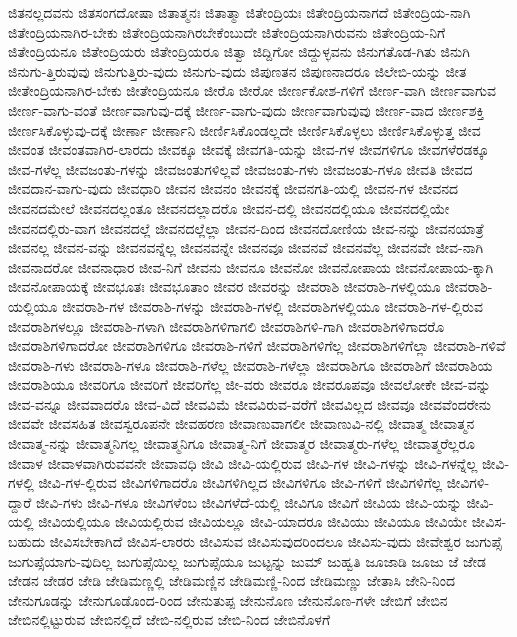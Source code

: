 {ಜಿತನಲ್ಲದವನು
ಜಿತಸಂಗದೋಷಾ
ಜಿತಾತ್ಮನಃ
ಜಿತಾತ್ಮಾ
ಜಿತೇಂದ್ರಿಯಃ
ಜಿತೇಂದ್ರಿಯನಾಗದೆ
ಜಿತೇಂದ್ರಿಯ-ನಾಗಿ
ಜಿತೇಂದ್ರಿಯನಾಗಿರ-ಬೇಕು
ಜಿತೇಂದ್ರಿಯನಾಗಿರಬೇಕೆಂಬುದೇ
ಜಿತೇಂದ್ರಿಯನಾಗಿರುವನು
ಜಿತೇಂದ್ರಿಯ-ನಿಗೆ
ಜಿತೇಂದ್ರಿಯನೂ
ಜಿತೇಂದ್ರಿಯರು
ಜಿತೇಂದ್ರಿಯರೂ
ಜಿತ್ವಾ
ಜಿದ್ದಿಗೋ
ಜಿದ್ದುಳ್ಳವನು
ಜಿನುಗತೊಡ-ಗಿತು
ಜಿನುಗಿ
ಜಿನುಗು-ತ್ತಿರುವುವು
ಜಿನುಗುತ್ತಿರು-ವುದು
ಜಿನುಗು-ವುದು
ಜಿಪುಣತನ
ಜಿಪುಣನಾದರೂ
ಜಿಲೇಬಿ-ಯನ್ನು
ಜೀತ
ಜೀತೇಂದ್ರಿಯನಾಗಿರ-ಬೇಕು
ಜೀತೇಂದ್ರಿಯನೂ
ಜೀರೊ
ಜೀರೋ
ಜೀರ್ಣಕೋಶ-ಗಳಿಗೆ
ಜೀರ್ಣ-ವಾಗಿ
ಜೀರ್ಣವಾಗುವ
ಜೀರ್ಣ-ವಾಗು-ವಂತೆ
ಜೀರ್ಣವಾಗುವು-ದಕ್ಕೆ
ಜೀರ್ಣ-ವಾಗು-ವುದು
ಜೀರ್ಣವಾಗುವುವು
ಜೀರ್ಣ-ವಾದ
ಜೀರ್ಣಶಕ್ತಿ
ಜೀರ್ಣಸಿಕೊಳ್ಳುವು-ದಕ್ಕೆ
ಜೀರ್ಣಾ
ಜೀರ್ಣಾನಿ
ಜೀರ್ಣಿಸಿಕೊಂಡಲ್ಲದೇ
ಜೀರ್ಣಿಸಿಕೊಳ್ಳಲು
ಜೀರ್ಣಿಸಿಕೊಳ್ಳುತ್ತ
ಜೀವ
ಜೀವಂತ
ಜೀವಂತವಾಗಿರ-ಲಾರದು
ಜೀವಕ್ಕೂ
ಜೀವಕ್ಕೆ
ಜೀವಗತಿ-ಯನ್ನು
ಜೀವ-ಗಳ
ಜೀವಗಳಿಗೂ
ಜೀವಗಳೆರಡಕ್ಕೂ
ಜೀವ-ಗಳೆಲ್ಲ
ಜೀವಜಂತು-ಗಳನ್ನು
ಜೀವಜಂತುಗಳಿಲ್ಲವೆ
ಜೀವಜಂತು-ಗಳು
ಜೀವಜಂತು-ಗಳೂ
ಜೀವತಿ
ಜೀವದ
ಜೀವದಾನ-ವಾಗು-ವುದು
ಜೀವಧಾರಿ
ಜೀವನ
ಜೀವನಂ
ಜೀವನಕ್ಕೆ
ಜೀವನಗತಿ-ಯಲ್ಲಿ
ಜೀವನ-ಗಳ
ಜೀವನದ
ಜೀವನದಮೇಲೆ
ಜೀವನದಲ್ಲಂತೂ
ಜೀವನದಲ್ಲಾದರೊ
ಜೀವನ-ದಲ್ಲಿ
ಜೀವನದಲ್ಲಿಯೂ
ಜೀವನದಲ್ಲಿಯೇ
ಜೀವನದಲ್ಲಿರು-ವಾಗ
ಜೀವನದಲ್ಲೆ
ಜೀವನದಲ್ಲೆಲ್ಲಾ
ಜೀವನ-ದಿಂದ
ಜೀವನದೋಣಿಯ
ಜೀವ-ನನ್ನು
ಜೀವನಯಾತ್ರೆ
ಜೀವನಲ್ಲ
ಜೀವನ-ವನ್ನು
ಜೀವನವನ್ನೆಲ್ಲ
ಜೀವನವನ್ನೇ
ಜೀವನವೂ
ಜೀವನವೆ
ಜೀವನವೆಲ್ಲ
ಜೀವನವೇ
ಜೀವ-ನಾಗಿ
ಜೀವನಾದರೋ
ಜೀವನಾಧಾರ
ಜೀವ-ನಿಗೆ
ಜೀವನು
ಜೀವನೂ
ಜೀವನೋ
ಜೀವನೋಪಾಯ
ಜೀವನೋಪಾಯ-ಕ್ಕಾಗಿ
ಜೀವನೋಪಾಯಕ್ಕೆ
ಜೀವಭೂತಃ
ಜೀವಭೂತಾಂ
ಜೀವರ
ಜೀವರನ್ನು
ಜೀವರಾಶಿ
ಜೀವರಾಶಿ-ಗಳಲ್ಲಿಯೂ
ಜೀವರಾಶಿ-ಯಲ್ಲಿಯೂ
ಜೀವರಾಶಿ-ಗಳ
ಜೀವರಾಶಿ-ಗಳನ್ನು
ಜೀವರಾಶಿ-ಗಳಲ್ಲಿ
ಜೀವರಾಶಿಗಳಲ್ಲಿಯೂ
ಜೀವರಾಶಿ-ಗಳ-ಲ್ಲಿರುವ
ಜೀವರಾಶಿಗಳಲ್ಲೂ
ಜೀವರಾಶಿ-ಗಳಾಗಿ
ಜೀವರಾಶಿಗಳಿಗಾಗಲಿ
ಜೀವರಾಶಿಗಳಿ-ಗಾಗಿ
ಜೀವರಾಶಿಗಳಿಗಾದರೊ
ಜೀವರಾಶಿಗಳಿಗಾದರೋ
ಜೀವರಾಶಿಗಳಿಗೂ
ಜೀವರಾಶಿ-ಗಳಿಗೆ
ಜೀವರಾಶಿಗಳಿಗೆಲ್ಲ
ಜೀವರಾಶಿಗಳಿಗೆಲ್ಲಾ
ಜೀವರಾಶಿ-ಗಳಿವೆ
ಜೀವರಾಶಿ-ಗಳು
ಜೀವರಾಶಿ-ಗಳೂ
ಜೀವರಾಶಿ-ಗಳೆಲ್ಲ
ಜೀವರಾಶಿ-ಗಳೆಲ್ಲಾ
ಜೀವರಾಶಿಗೂ
ಜೀವರಾಶಿಗೆ
ಜೀವರಾಶಿಯ
ಜೀವರಾಶಿಯೂ
ಜೀವರಿಗೂ
ಜೀವರಿಗೆ
ಜೀವರಿಗೆಲ್ಲ
ಜೀ-ವರು
ಜೀವರೂ
ಜೀವರೂಪವೂ
ಜೀವಲೋಕೇ
ಜೀವ-ವನ್ನು
ಜೀವ-ವನ್ನೂ
ಜೀವವಾದರೊ
ಜೀವ-ವಿದೆ
ಜೀವವಿಮೆ
ಜೀವವಿರುವ-ವರೆಗೆ
ಜೀವವಿಲ್ಲದ
ಜೀವವೂ
ಜೀವವೆಂದರೇನು
ಜೀವವೇ
ಜೀವಸಹಿತ
ಜೀವಸ್ವರೂಪನೇ
ಜೀವಹರಣ
ಜೀವಾಣುವಾಗಲೀ
ಜೀವಾಣುವಿ-ನಲ್ಲಿ
ಜೀವಾತ್ಮ
ಜೀವಾತ್ಮನ
ಜೀವಾತ್ಮ-ನನ್ನು
ಜೀವಾತ್ಮನಿಗಲ್ಲ
ಜೀವಾತ್ಮನಿಗೂ
ಜೀವಾತ್ಮ-ನಿಗೆ
ಜೀವಾತ್ಮರ
ಜೀವಾತ್ಮರು-ಗಳೆಲ್ಲ
ಜೀವಾತ್ಮರೆಲ್ಲರೂ
ಜೀವಾಳ
ಜೀವಾಳವಾಗಿರುವವನೇ
ಜೀವಾವಧಿ
ಜೀವಿ
ಜೀವಿ-ಯಲ್ಲಿರುವ
ಜೀವಿ-ಗಳ
ಜೀವಿ-ಗಳನ್ನು
ಜೀವಿ-ಗಳನ್ನೆಲ್ಲ
ಜೀವಿ-ಗಳಲ್ಲಿ
ಜೀವಿ-ಗಳ-ಲ್ಲಿರುವ
ಜೀವಿಗಳಿಗಾದರೊ
ಜೀವಿಗಳಿಗಿಲ್ಲದ
ಜೀವಿಗಳಿಗೂ
ಜೀವಿ-ಗಳಿಗೆ
ಜೀವಿಗಳಿಗೆಲ್ಲ
ಜೀವಿಗಳಿ-ದ್ದಾರೆ
ಜೀವಿ-ಗಳು
ಜೀವಿ-ಗಳೂ
ಜೀವಿಗಳೆಂಬ
ಜೀವಿಗಳೆದೆ-ಯಲ್ಲಿ
ಜೀವಿಗೂ
ಜೀವಿಗೆ
ಜೀವಿಯ
ಜೀವಿ-ಯನ್ನು
ಜೀವಿ-ಯಲ್ಲಿ
ಜೀವಿಯಲ್ಲಿಯೂ
ಜೀವಿಯಲ್ಲಿರುವ
ಜೀವಿಯಲ್ಲೂ
ಜೀವಿ-ಯಾದರೂ
ಜೀವಿಯು
ಜೀವಿಯೂ
ಜೀವಿಯೇ
ಜೀವಿಸ-ಬಹುದು
ಜೀವಿಸಬೇಕಾಗಿದೆ
ಜೀವಿಸ-ಲಾರರು
ಜೀವಿಸುವ
ಜೀವಿಸುವುದರಿಂದಲೂ
ಜೀವಿಸು-ವುದು
ಜೀವೇಶ್ವರ
ಜುಗುಪ್ಸೆ
ಜುಗುಪ್ಸೆಯಾಗು-ವುದಿಲ್ಲ
ಜುಗುಪ್ಸೆಯಿಲ್ಲ
ಜುಗುಪ್ಸೆಯೂ
ಜುಟ್ಟನ್ನು
ಜುಮ್
ಜುಹ್ವತಿ
ಜೂಜಾಡಿ
ಜೂಜು
ಜೆ
ಜೇಡ
ಜೇಡನ
ಜೇಡರ
ಜೇಡಿ
ಜೇಡಿಮಣ್ಣಲ್ಲಿ
ಜೇಡಿಮಣ್ಣಿನ
ಜೇಡಿಮಣ್ಣಿ-ನಿಂದ
ಜೇಡಿಮಣ್ಣು
ಜೇತಾಸಿ
ಜೇನಿ-ನಿಂದ
ಜೇನುಗೂಡನ್ನು
ಜೇನುಗೂಡೊಂದ-ರಿಂದ
ಜೇನುತುಪ್ಪ
ಜೇನುನೊಣ
ಜೇನುನೊಣ-ಗಳೇ
ಜೇಬಿಗೆ
ಜೇಬಿನ
ಜೇಬಿನಲ್ಲಿಟ್ಟುರುವ
ಜೇಬಿನಲ್ಲಿದೆ
ಜೇಬಿ-ನಲ್ಲಿರುವ
ಜೇಬಿ-ನಿಂದ
ಜೇಬಿನೊಳಗೆ
}
